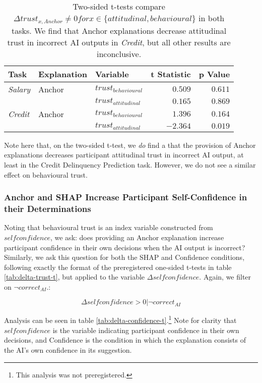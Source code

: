 \begin{table}[htb]
    \centering
    \caption{Two-sided t-tests compare $\Delta trust_{x,Anchor} \neq 0 for x \in \{attitudinal, behavioural\}$ in both tasks. We find that Anchor explanations decrease attitudinal trust in incorrect AI outputs in \emph{Credit}, but all other results are inconclusive.}
    \label{tab:delta-trust-t-2}
    \begin{tabular}{lllrr}
        \toprule
        Task & Explanation & Variable & t Statistic & p Value \\ 
        \midrule
        \emph{Salary} & Anchor & $trust_{behavioural}$ & $0.509$ & $0.611$ \\
        & & $trust_{attitudinal}$ & $0.165$ & $0.869$ \\
        \midrule
        \emph{Credit} & Anchor & $trust_{behavioural}$ & $1.396$ & $0.164$ \\
        & & $trust_{attitudinal}$ & $\mathbf{-2.364}$ & $\mathbf{0.019}$ \\
        \bottomrule
    \end{tabular}
\end{table}

Note here that, on the two-sided t-test, we \textit{do} find a that the provision of Anchor explanations decreases participant attitudinal trust in incorrect AI output, at least in the Credit Delinquency Prediction task. However, we do not see a similar effect on behavioural trust. 

\subsubsection{Anchor and SHAP Increase Participant Self-Confidence in their Determinations}
Noting that behavioural trust is an index variable constructed from $selfconfidence$, we ask: does providing an Anchor explanation increase participant confidence in their own decisions when the AI output is incorrect? Similarly, we ask this question for both the SHAP and Confidence conditions, following exactly the format of the preregistered one-sided t-tests in table \ref{tab:delta-trust-t}, but applied to the variable $\Delta selfconfidence$. Again, we filter on $\neg correct_{AI}$.:

\begin{equation}
    \Delta selfconfidence > 0 | \neg correct_{AI}
\end{equation}

Analysis can be seen in table \ref{tab:delta-confidence-t}.\footnote{This analysis was not preregistered.} Note for clarity that $selfconfidence$ is the variable indicating participant confidence in their own decisions, and Confidence is the condition in which the explanation consists of the AI's own confidence in its suggestion.

